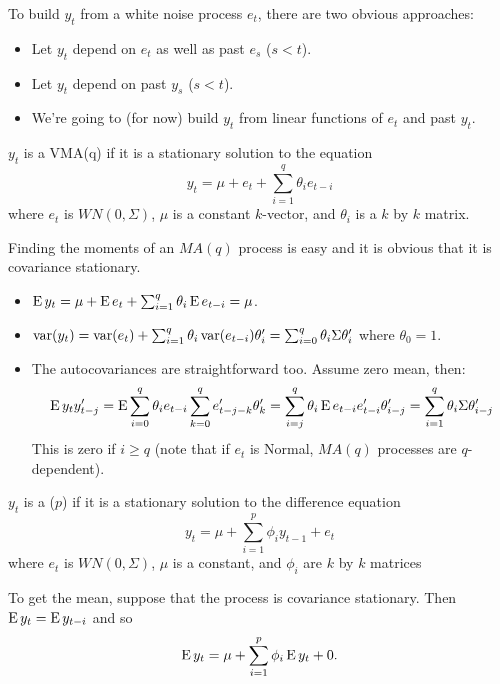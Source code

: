 To build $y_t$ from a white noise process $e_t$, there are two obvious
approaches:
\begin{itemize}
\item Let $y_t$ depend on $e_t$ as well as past $e_s$ ($s < t$).
\item Let $y_t$ depend on past $y_s$ ($s < t$).
\item We're going to (for now) build $y_t$ from linear functions of
  $e_t$ and past $y_t$.
\end{itemize}

\begin{defn}
  $y_t$ is a VMA(q) if it is a stationary solution to the equation
  \[y_t = \mu + e_t + \sum_{i=1}^q \theta_i e_{t-i}\] where $e_t$ is
  $WN(0, \Sigma)$, $\mu$ is a constant $k$-vector, and $\theta_i$ is a
  $k$ by $k$ matrix.
\end{defn}

Finding the moments of an $MA(q)$ process is easy and it is obvious
that it is covariance stationary.

  \begin{itemize}
  \item $\operatorname{E} y_t = \mu + \operatorname{E} e_t + \sum_{i=1}^q \theta_i \operatorname{E} e_{t-i} = \mu$.
  \item $\operatorname{var}(y_t) = \operatorname{var}(e_t) + \sum_{i=1}^q \theta_i \operatorname{var}(e_{t-i}) \theta_i' =
    \sum_{i=0}^q \theta_i \Sigma \theta_i'$ where $\theta_0 = 1$.
  \item The autocovariances are straightforward too. Assume zero mean,
    then:
    \[\operatorname{E} y_t y_{t-j}' = \operatorname{E} \sum_{i=0}^q \theta_i e_{t-i} \sum_{k=0}^q e_{t-j-k}' \theta_k'
    = \sum_{i=j}^q \theta_i \operatorname{E} e_{t-i} e_{t-i}' \theta_{i-j}'
    = \sum_{i=1}^q \theta_i \Sigma \theta_{i-j}'\]
    This is zero if $i \geq q$ (note that if $e_t$ is Normal, $MA(q)$
    processes are $q$-dependent).
  \end{itemize}

\begin{defn}
  $y_t$ is a \VAR($p$) if it is a stationary solution to the
  difference equation
  \begin{equation*}
    y_t = \mu + \sum_{i=1}^p \phi_i y_{t-1} + e_t
  \end{equation*}
  where $e_t$ is $WN(0, \Sigma)$, $\mu$ is a constant, and $\phi_i$
  are $k$ by $k$ matrices
\end{defn}

  To get the mean, suppose that the process is covariance
  stationary. Then $\operatorname{E} y_t = \operatorname{E} y_{t-i}$ and so
  \[\operatorname{E} y_t = \mu + \sum_{i=1}^p \phi_i \operatorname{E} y_t + 0.\]

